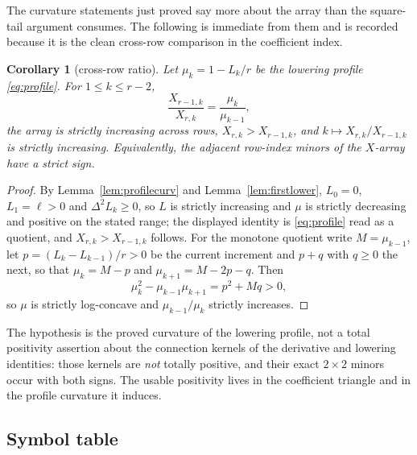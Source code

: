 \documentclass[11pt,a4paper]{article}
\theoremstyle{plain}
\newtheorem{corollary}[theorem]{Corollary}
\theoremstyle{definition}
\theoremstyle{remark}
\begin{document}
The curvature statements just proved say more about the array than the
square-tail argument consumes. The following is immediate from them and is
recorded because it is the clean cross-row comparison in the coefficient index.

\begin{corollary}[cross-row ratio]\label{cor:crossrow}
Let $\mu_k=1-L_k/r$ be the lowering profile \eqref{eq:profile}. For
$1\le k\le r-2$,
\[
  \frac{X_{r-1,k}}{X_{r,k}}=\frac{\mu_k}{\mu_{k-1}},
\]
the array is strictly increasing across rows, $X_{r,k}>X_{r-1,k}$, and
$k\mapsto X_{r,k}/X_{r-1,k}$ is strictly increasing. Equivalently, the
adjacent row-index minors of the $X$-array have a strict sign.
\end{corollary}

\begin{proof}
By Lemma~\ref{lem:profilecurv} and Lemma~\ref{lem:firstlower}, $L_0=0$,
$L_1=\ell>0$ and $\Delta^2L_k\ge0$, so $L$ is strictly increasing and $\mu$ is
strictly decreasing and positive on the stated range; the displayed identity is
\eqref{eq:profile} read as a quotient, and $X_{r,k}>X_{r-1,k}$ follows. For the
monotone quotient write $M=\mu_{k-1}$, let $p=(L_k-L_{k-1})/r>0$ be the current
increment and $p+q$ with $q\ge0$ the next, so that $\mu_k=M-p$ and
$\mu_{k+1}=M-2p-q$. Then
\[
  \mu_k^2-\mu_{k-1}\mu_{k+1}=p^2+Mq>0,
\]
so $\mu$ is strictly log-concave and $\mu_{k-1}/\mu_k$ strictly increases.
\end{proof}

The hypothesis is the proved curvature of the lowering profile, not a total
positivity assertion about the connection kernels of the derivative and
lowering identities: those kernels are \emph{not} totally positive, and their
exact $2\times2$ minors occur with both signs. The usable positivity lives in
the coefficient triangle and in the profile curvature it induces.

\subsection{Symbol table}\label{sec:symbols}
\end{document}
